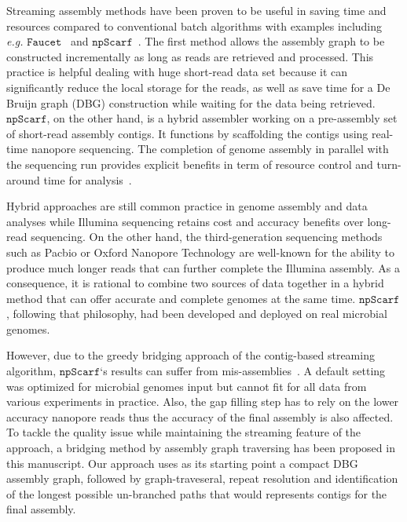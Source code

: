 \documentclass[10pt,letterpaper]{article}
\newcommand{\npscarf}{$\mathtt{npScarf}$}
\newcommand{\EG}{\emph{e.g.}}
\begin{document}
Streaming assembly methods have been proven to be useful in saving time and resources compared to conventional batch algorithms with examples including \EG{} $\mathtt{Faucet}$~\cite{Rozov2017faucet} and \npscarf{}~\cite{Cao2017scaffolding}. The first method allows the assembly graph to be constructed incrementally as long as reads are retrieved and processed. This practice is helpful dealing with huge short-read data set because it can significantly reduce the local storage for the reads, as well as save time for a De Bruijn graph (DBG) construction while waiting for the data being retrieved.
\npscarf{}, on the other hand, 
is a hybrid assembler working on a pre-assembly set of short-read assembly contigs. It functions by scaffolding the contigs using real-time nanopore sequencing. The completion of genome assembly in parallel with the sequencing run provides explicit benefits in term of resource control and turn-around time for analysis~\cite{Cao2017scaffolding}.  

Hybrid approaches are still common practice in genome assembly and data analyses while Illumina sequencing retains cost and accuracy benefits over long-read sequencing.
On the other hand, the third-generation sequencing methods such as Pacbio or Oxford Nanopore Technology are well-known for the ability to produce much longer reads that can further complete the Illumina assembly.
As a consequence, it is rational to combine two sources of data together in a hybrid method that can offer accurate and complete genomes at the same time.
\npscarf{}, following that philosophy, had been developed and deployed on real microbial genomes.

However, due to the greedy bridging approach of the contig-based streaming algorithm, \npscarf{}`s results can suffer from mis-assemblies~\cite{Wick2017unicycler,Giordano2017}. 
A default setting was optimized for microbial genomes input but cannot fit for all data from various experiments in practice.
Also, the gap filling step has to rely on the lower accuracy nanopore reads thus the accuracy of the final assembly is also affected. 
To tackle the quality issue while maintaining the streaming feature of the approach, a bridging method by assembly graph traversing has been proposed in this manuscript. 
Our approach uses as its starting point a compact DBG assembly graph, followed by graph-traveseral, repeat resolution and identification of the longest possible un-branched paths that would represents contigs for the final assembly.
\end{document}
